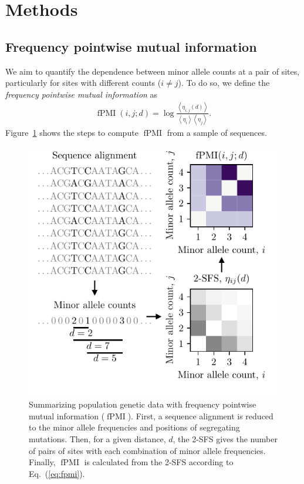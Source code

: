 \documentclass[11pt, letterpaper]{article}   	%
\newcommand{\eq}[1]{Eq.~(\ref{#1})}
\newcommand{\Fig}[1]{Figure~\ref{#1}}
\newcommand{\E}[1]{\left< #1 \right>}
\DeclareMathOperator{\fpmi}{fPMI}
\begin{document}
\section*{Methods}

\subsection*{Frequency pointwise mutual information}

We aim to quantify the dependence between minor allele counts at a pair of sites, particularly for sites with different counts ($i\neq j$).
To do so, we define the \textit{frequency pointwise mutual information} as
\begin{align}
    \fpmi(i,j;d) = \log \frac{\E{\eta_{i,j}(d)}}{\E{\eta_i} \E{\eta_j}}.
    \label{eq:fpmi}
\end{align}
\Fig{fig:schematic} shows the steps to compute $\fpmi$ from a sample of sequences.

\begin{figure}
\centering
\includegraphics[scale=1]{figures/schematic.pdf}
\caption{Summarizing population genetic data with frequency pointwise mutual information ($\fpmi$). First, a sequence alignment is reduced to the minor allele frequencies and positions of segregating mutations. Then, for a given distance, $d$, the 2-SFS gives the number of pairs of sites with each combination of minor allele frequencies. Finally, $\fpmi$ is calculated from the 2-SFS according to \eq{eq:fpmi}.
 \label{fig:schematic}}
\end{figure}
\end{document}
